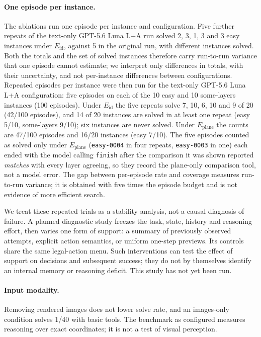 \paragraph{One episode per instance.} The ablations run one episode per instance and configuration.
Five further repeats of the text-only GPT-5.6 Luna L+A run solved 2, 3, 1, 3 and 3 easy instances
under $E_{\mathrm{id}}$, against 5 in the original run, with different instances solved. Both the totals and the set of solved instances therefore carry
run-to-run variance that one episode cannot estimate; we interpret only differences in totals, with
their uncertainty, and not per-instance differences between configurations. Repeated episodes per
instance were then run for the text-only GPT-5.6 Luna L+A configuration: five episodes on each
of the 10 easy and 10 some-layers instances (100 episodes). Under $E_{\mathrm{id}}$ the five
repeats solve 7, 10, 6, 10 and 9 of 20 (42/100 episodes), and 14 of 20 instances are solved in at
least one repeat (easy 5/10, some-layers 9/10); six instances are never solved. Under
$E_{\mathrm{plane}}$ the counts are 47/100 episodes and 16/20 instances (easy 7/10). The five
episodes counted as solved only under $E_{\mathrm{plane}}$ (\texttt{easy-0004} in four repeats,
\texttt{easy-0003} in one) each ended with the model calling \texttt{finish} after the comparison
it was shown reported \emph{matches} with every layer agreeing, so they record the plane-only
comparison tool, not a model error. The gap between per-episode rate and coverage measures
run-to-run variance; it is obtained with five times the episode budget and is not evidence of more
efficient search.

We treat these repeated trials as a stability analysis, not a causal diagnosis of failure.
A planned diagnostic study freezes the task, state, history and reasoning effort, then varies
one form of support: a summary of previously observed attempts, explicit action semantics, or
uniform one-step previews. Its controls share the same legal-action menu. Such interventions
can test the effect of support on decisions and subsequent success; they do not by themselves
identify an internal memory or reasoning deficit. This study has not yet been run.

\paragraph{Input modality.} Removing rendered images does not lower solve rate, and an images-only
condition solves 1/40 with basic tools. The benchmark as configured measures reasoning over exact
coordinates; it is not a test of visual perception.

